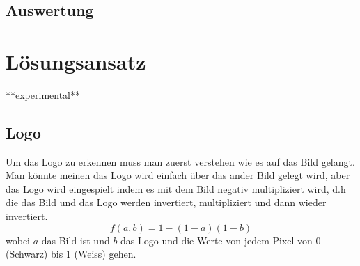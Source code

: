 \documentclass[12pt,a4paper]{report}
\begin{document}
\section{Auswertung}



\chapter{Lösungsansatz}
\label{ch:lösungsansatz}
**experimental**
\section{Logo}
Um das Logo zu erkennen muss man zuerst verstehen wie es auf das Bild gelangt.
Man könnte meinen das Logo wird einfach über das ander Bild gelegt wird,
aber das Logo wird eingespielt indem es mit dem Bild negativ multipliziert wird,
d.h die das Bild und das Logo werden invertiert, multipliziert und dann wieder invertiert.\cite{wiki:blend}
\[f(a,b) = 1 - (1-a)(1-b)\]
wobei $a$ das Bild ist und $b$ das Logo und die Werte von jedem Pixel von 0 (Schwarz) bis 1 (Weiss) gehen.
\end{document}
